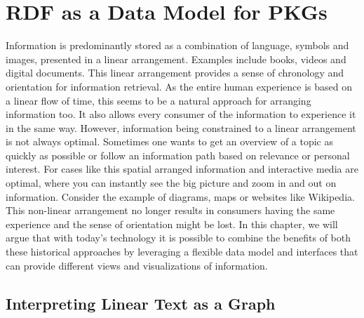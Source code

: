 \chapter{RDF as a Data Model for PKGs} \label{ch:model}



Information is predominantly stored as a combination of language, symbols and images, presented in a linear arrangement. Examples include books, videos and digital documents. This linear arrangement provides a sense of chronology and orientation for information retrieval. As the entire human experience is based on a linear flow of time, this seems to be a natural approach for arranging information too. It also allows every consumer of the information to experience it in the same way. However, information being constrained to a linear arrangement is not always optimal. Sometimes one wants to get an overview of a topic as quickly as possible or follow an information path based on relevance or personal interest. For cases like this spatial arranged information and interactive media are optimal, where you can instantly see the big picture and zoom in and out on information. Consider the example of diagrams, maps or websites like Wikipedia. This non-linear arrangement no longer results in consumers having the same experience and the sense of orientation might be lost. In this chapter, we will argue that with today's technology it is possible to combine the benefits of both these historical approaches by leveraging a flexible data model and interfaces that can provide different views and visualizations of information. 

\section{Interpreting Linear Text as a Graph}

